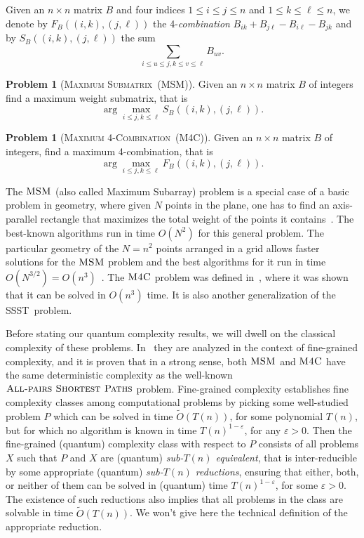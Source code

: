 \documentclass[12pt]{article}
\newcommand{\MaxSubMf}{\textsc{Maximum Submatrix}}
\newcommand{\MaxSubM}{\textsc{MSM}}
\newcommand{\MaxFourCf}{\textsc{Maximum 4-Combination}}
\newcommand{\MaxFourC}{\textsc{M4C}}
\newcommand{\SSST}{\textsc{SSST}}
\newcommand{\APSPf}{\textsc{All-pairs Shortest Paths}}
\theoremstyle{definition}
\newtheorem{problem}[theorem]{Problem}
\begin{document}
Given an $n \times n$ matrix $B$ and four indices $1 \leq i \leq j \leq n$ and $1 \leq k \leq \ell \leq n$, we denote by $F_B((i,k),(j,\ell))$ the 4-{\em combination} $B_{ik} + B_{j \ell} - B_{i \ell} - B_{jk}$ and by $S_B((i,k),(j,\ell))$ the sum
$$\sum_{i \leq u \leq j, k \leq v \leq \ell} B_{uv}.$$

\begin{problem}[\MaxSubMf \ (\MaxSubM)]
\label{prob:maxsubm}
 Given an $n \times n$ matrix $B$ of integers find a maximum weight submatrix, that is $$\arg\max_{i \leq j, k \leq  \ell } S_B((i,k),(j,\ell)).$$
\end{problem}

\begin{problem}[\MaxFourCf \ (\MaxFourC)]
\label{prob:maxfourc}
 Given an $n \times n$ matrix $B$ of integers, find a maximum 4-combination, that is $$\arg\max_{i \leq j, k \leq  \ell } F_B((i,k),(j,\ell)).$$
\end{problem}

The $\MaxSubM$ (also called Maximum Subarray) problem is a special case of a basic problem in geometry, where given $N$ points in the plane, one has to find an axis-parallel rectangle that maximizes the total weight of the points it contains~\cite{DGM96, BCNP14}. The best-known algorithms run in time $O(N^2)$ for this general problem. The particular geometry of the $N =n^2$ points arranged in a grid allows faster solutions for the $\MaxSubM$ problem and the best algorithms for it run in time $O(N^{3/2}) = O(n^3)$~\cite{TT98, Tak02}. The $\MaxFourC$ problem was defined in~\cite{BDT16}, where it was shown that it can be solved in $O(n^3)$ time. It is also another generalization of the \SSST \ problem. 

Before stating our quantum complexity results, we will dwell on the classical complexity of these problems. 
In~\cite{BDT16} they are analyzed in the context of fine-grained complexity, and it is proven that in a strong sense, both $\MaxSubM$ and $\MaxFourC$ have the same deterministic complexity as the well-known $\APSPf$ problem.  
Fine-grained complexity establishes fine complexity classes among computational problems by picking some well-studied problem $P$ which can be solved in time $\widetilde{O}(T(n))$, for some polynomial $T(n)$, but for which no algorithm is known in time $T(n)^{1- \varepsilon}$, for any $\varepsilon > 0$.
Then the fine-grained (quantum) complexity class with respect to $P$ consists of all problems $X$ such that $P$ and $X$ are (quantum) {\em sub-$T(n)$ equivalent}, that is inter-reducible by some appropriate (quantum) {\em sub-$T(n)$ reductions}, ensuring that either, both, or neither of them can be solved in (quantum) time $T(n)^{1- \varepsilon}$, for some $\varepsilon > 0$. The existence of such reductions also implies that all problems in the class are solvable in time $\widetilde{O}(T(n))$. We won't give here the technical definition of the appropriate reduction.
\end{document}

